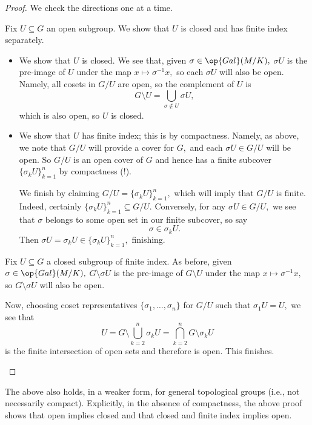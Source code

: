 \documentclass[../notes.tex]{subfiles}
\begin{document}
\begin{proof}
	We check the directions one at a time.
	\begin{listalph}
		\item Fix $U\subseteq G$ an open subgroup. We show that $U$ is closed and has finite index separately.
		\begin{itemize}
			\item We show that $U$ is closed. We see that, given $\sigma\in\op{Gal}(M/K),$ $\sigma U$ is the pre-image of $U$ under the map $x\mapsto\sigma^{-1}x,$ so each $\sigma U$ will also be open. Namely, all cosets in $G/U$ are open, so the complement of $U$ is
			\[G\setminus U=\bigcup_{\sigma\notin U}\sigma U,\]
			which is also open, so $U$ is closed.
			\item We show that $U$ has finite index; this is by compactness. Namely, as above, we note that $G/U$ will provide a cover for $G,$ and each $\sigma U\in G/U$ will be open. So $G/U$ is an open cover of $G$ and hence has a finite subcover $\{\sigma_kU\}_{k=1}^n$ by compactness (!).

			We finish by claiming $G/U=\{\sigma_kU\}_{k=1}^n,$ which will imply that $G/U$ is finite. Indeed, certainly $\{\sigma_kU\}_{k=1}^n\subseteq G/U.$ Conversely, for any $\sigma U\in G/U,$ we see that $\sigma$ belongs to some open set in our finite subcover, so say
			\[\sigma\in\sigma_kU.\]
			Then $\sigma U=\sigma_kU\in\{\sigma_kU\}_{k=1}^n,$ finishing.
		\end{itemize}

		\item Fix $U\subseteq G$ a closed subgroup of finite index. As before, given $\sigma\in\op{Gal}(M/K),$ $G\setminus\sigma U$ is the pre-image of $G\setminus U$ under the map $x\mapsto\sigma^{-1}x,$ so $G\setminus\sigma U$ will also be open.

		Now, choosing coset representatives $\{\sigma_1,\ldots,\sigma_n\}$ for $G/U$ such that $\sigma_1U=U,$ we see that
		\[U=G\setminus\bigcup_{k=2}^n\sigma_kU=\bigcap_{k=2}^nG\setminus\sigma_kU\]
		is the finite intersection of open sets and therefore is open. This finishes.
		\qedhere
	\end{listalph}
\end{proof}
\begin{remark}
	The above also holds, in a weaker form, for general topological groups (i.e., not necessarily compact). Explicitly, in the absence of compactness, the above proof shows that open implies closed and that closed and finite index implies open.
\end{remark}
\end{document}
